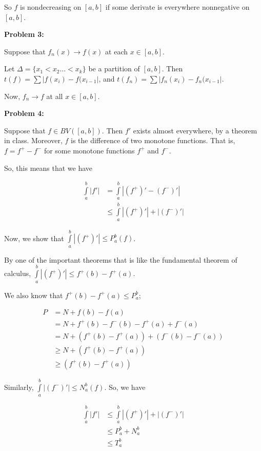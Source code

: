 \documentclass[a4paper,12pt]{article}
\newcommand{\tab}{\hspace{4mm}} %
\newcommand{\shunt}{\vspace{20mm}}
\newcommand{\absval}[1]{\left\lvert #1 \right\rvert}
\newcommand{\De}{\Delta}
\begin{document}
So $f$ is nondecreasing on $[a,b]$ if some derivate is everywhere nonnegative on $[a,b]$.

\shunt

{\bf Problem 3:} %

Suppose that $f_n(x) \to f(x)$ at each $x \in [a,b]$.

Let $\De = \{x_1 < x_2 \ldots < x_k\}$ be a partition of $[a,b]$. Then $t(f) = \sum \absval{f(x_i)-f(x_{i-1}}$, and  $t(f_n) = \sum \absval{f_n(x_i)-f_n(x_{i-1}}$.

Now, $f_n \to f$ at all $x \in [a,b]$.


\shunt

{\bf Problem 4:} 

Suppose that $f \in BV([a,b])$. 
Then $f'$ exists almost everywhere, by a theorem in class. 
Moreover, $f$ is the difference of two monotone functions. 
That is, $f= f^+ -f^-$ for some monotone functions $f^+$ and $f^-$.

So, this means that we have

\begin{align*}
\int\limits_a^b \absval{f'} &= \int\limits_a^b \absval{(f^+)' - (f^-)'} \\
&\leq \int\limits_a^b \absval{(f^+)'} + \absval{(f^-)'}
\end{align*}

Now, we show that $\int\limits_a^b \absval{(f^+)'} \leq P_a^b(f)$.

\tab By one of the important theorems that is like the fundamental theorem of calculus, $\int\limits_a^b \absval{(f^+)'} \leq f^+(b)-f^+(a)$.

\tab We also know that $f^+(b) - f^+(a) \leq P_a^b$; 

\begin{align*}
P &= N +f(b)-f(a)\\
&=N+f^+(b)-f^-(b)-f^+(a)+f^-(a)\\
&=N+(f^+(b)-f^+(a))+(f^-(b)-f^-(a))\\
&\geq N+(f^+(b)-f^+(a))\\
&\geq (f^+(b)-f^+(a))
\end{align*}

Similarly, $\int\limits_a^b \absval{(f^-)'} \leq N_a^b(f)$. So, we have

\begin{align*}
\int\limits_a^b \absval{f'} &\leq \int\limits_a^b \absval{(f^+)'} + \absval{(f^-)'}\\
&\leq P_a^b + N_a^b \\
&\leq T_a^b
\end{align*}
\end{document}
